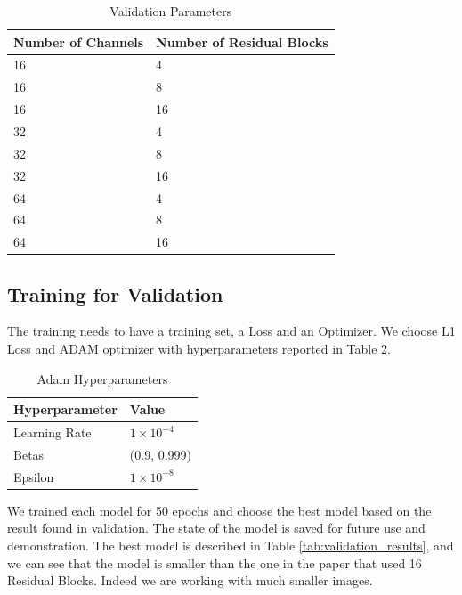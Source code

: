 \documentclass[../report.tex]{subfiles}
\begin{document}
\begin{table}[h]
	\centering
	\caption{Validation Parameters}
	\begin{tabular}{@{}ll@{}}
		\toprule
		\textbf{Number of Channels} & \textbf{Number of Residual Blocks} \\ \midrule
		16                           & 4 \\ 
		16                           & 8 \\ 
		16                           & 16 \\ 
		32                           & 4 \\ 
		32                           & 8 \\ 
		32                           & 16 \\ 
		64                           & 4 \\ 
		64                           & 8 \\ 
		64                           & 16 \\ 
		\bottomrule
	\end{tabular}
	\label{tab:validation_parameters}
\end{table}

\subsection{Training for Validation}
The training needs to have a training set, a Loss and an Optimizer.
We choose L1 Loss and ADAM optimizer with hyperparameters reported in Table \ref{tab:adam_hyperparameters}.
\begin{table}[h]
	\centering
	\caption{Adam Hyperparameters}
	\begin{tabular}{@{}ll@{}}
		\toprule
		\textbf{Hyperparameter} & \textbf{Value} \\ \midrule
		Learning Rate           & $1 \times 10^{-4}$ \\ 
		Betas                   & (0.9, 0.999) \\ 
		Epsilon                 & $1 \times 10^{-8}$ \\ 
		\bottomrule
	\end{tabular}
	\label{tab:adam_hyperparameters}
\end{table}
We trained each model for 50 epochs and choose the best model based on the result found in validation.
The state of the model is saved for future use and demonstration.
The best model is described in Table \ref{tab:validation_results}, and we can see that the model is smaller than the one in the paper that used 16 Residual Blocks. Indeed we are working with much smaller images.
\end{document}
